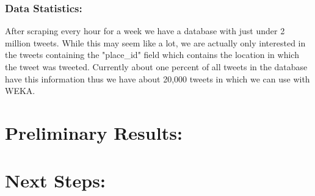 \documentclass[12pt]{article}
\begin{document}
\subsubsection*{Data Statistics:}
After scraping every hour for a week we have a database with just under 2 million tweets.  While this may seem like a lot, we are actually only interested in the tweets containing the "place_id" field which contains the location in which the tweet was tweeted.  Currently about one percent of all tweets in the database have this information thus we have about 20,000 tweets in which we can use with WEKA.


\section*{Preliminary Results:}


\section*{Next Steps:}
\end{document}
